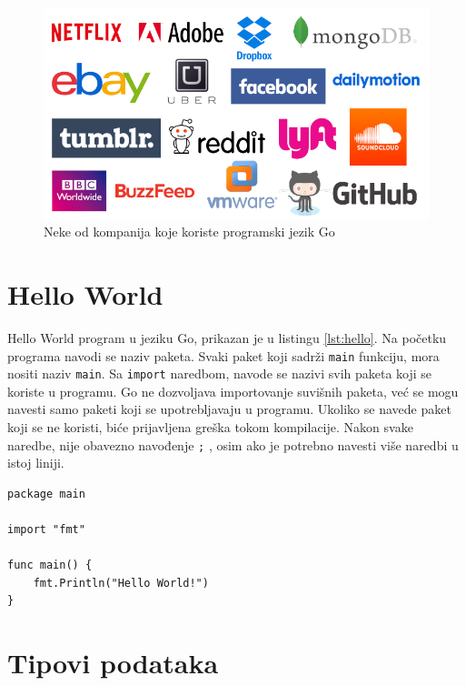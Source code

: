 \documentclass[12pt,oneside]{memoir}
\begin{document}
\begin{figure}
\begin{center}
\includegraphics[scale=2]{companies.png}
\end{center}
\caption{Neke od kompanija koje koriste programski jezik Go}
\label{fig:comp}
\end{figure}

\section{Hello World}
Hello World program u jeziku Go, prikazan je u listingu \ref{lst:hello}. Na početku programa navodi se naziv paketa. Svaki paket koji sadrži \texttt{main} funkciju, mora nositi naziv \texttt{main}. Sa \texttt{import} naredbom, navode se nazivi svih paketa koji se koriste u programu. Go ne dozvoljava importovanje suvišnih paketa, već se mogu navesti samo paketi koji se upotrebljavaju u programu. Ukoliko se navede paket koji se ne koristi, biće prijavljena greška tokom kompilacije. Nakon svake naredbe, nije obavezno navođenje \texttt{;} , osim ako je potrebno navesti više naredbi u istoj liniji. 

\begin{center}
\begin{lstlisting}[caption=Hello World program u jeziku Go,label={lst:hello},  backgroundcolor=\color{background}]
package main

import "fmt"

func main() {
	fmt.Println("Hello World!")
}
\end{lstlisting}
\end{center}

\section{Tipovi podataka}
\end{document}
